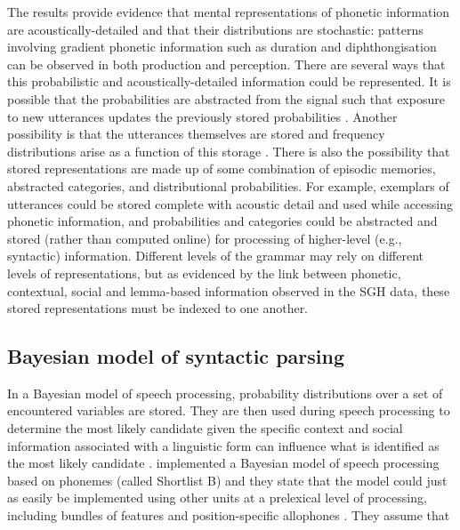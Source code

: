 The results provide evidence that mental representations of phonetic information are acoustically-detailed and that their distributions are stochastic: patterns involving gradient phonetic information such as duration and diphthongisation can be observed in both production and perception.  There are several ways that this probabilistic and acoustically-detailed information could be represented.  It is possible that the probabilities are abstracted from the signal such that exposure to new utterances updates the previously stored probabilities \cite{norrismcqueen2008}.  Another possibility is that the utterances themselves are stored and frequency distributions arise as a function of this storage \cite{pierrehumbert2001}.  There is also the possibility that stored representations are made up of some combination of episodic memories, abstracted categories, and distributional probabilities.  For example, exemplars of utterances could be stored complete with acoustic detail and used while accessing phonetic information, and probabilities and categories could be abstracted and stored (rather than computed online) for processing of higher-level (e.g., syntactic) information.  Different levels of the grammar may rely on different levels of representations, but as evidenced by the link between phonetic, contextual, social and lemma-based information observed in the SGH data, these stored representations must be indexed to one another.  



\subsection{Bayesian model of syntactic parsing}
  
In a Bayesian model of speech processing, probability distributions over a set of encountered variables are stored.  They are then used during speech processing to determine the most likely candidate given the specific context \cite{norrismcqueen2008} and social information associated with a linguistic form can influence what is identified as the most likely candidate \cite{staumcasasanto2009}.   implemented a Bayesian model of speech processing based on phonemes (called Shortlist B) and they state that the model could just as easily be implemented using other units at a prelexical level of processing, including bundles of features and position-specific allophones \cite[362]{norrismcqueen2008}.  They assume that

